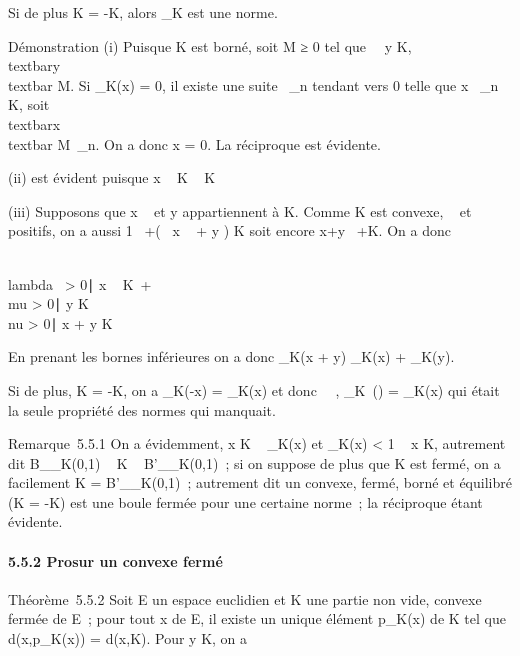 \documentclass[]{article}
\begin{document}
Si de plus K = -K, alors \jmath\_K est une norme.

Démonstration (i) Puisque K est borné, soit M ≥ 0 tel que
\forall~~y \in K,
\\textbar{}y\\textbar{} \leq M. Si
\jmath\_K(x) = 0, il existe une suite \lambda~\_n tendant vers 0
telle que  x \over \lambda~\_n \in K, soit
\\textbar{}x\\textbar{} \leq M\lambda~\_n.
On a donc x = 0. La réciproque est évidente.

(ii) est évident puisque  x \over \lambda~ \in K
\Leftrightarrow \mux \over \mu\lambda~ \in K

(iii) Supposons que  x \over \lambda~ et  y
\over \mu appartiennent à K. Comme K est convexe, \lambda~ et \mu
positifs, on a aussi  1 \over \lambda~+\mu (\lambda~ x
\over \lambda~ + \mu y \over \mu ) \in K soit
encore  x+y \over \lambda~+\mu \in K. On a donc

\\lambda~ \textgreater{} 0∣ x
\over \lambda~ \in K\ + \\mu
\textgreater{} 0∣ y \over
\mu \in K\ \subset~\\nu \textgreater{}
0∣ x + y \over \nu \in
K\

En prenant les bornes inférieures on a donc \jmath\_K(x + y) \leq
\jmath\_K(x) + \jmath\_K(y).

Si de plus, K = -K, on a \jmath\_K(-x) = \jmath\_K(x) et donc
\forall~\mu \in {}~, \jmath\_K~(\mux) =
\textbar{}\mu\textbar{}\jmath\_K(x) qui était la seule propriété des
normes qui manquait.

Remarque~5.5.1 On a évidemment, x \in K \rigtharrow~ \jmath\_K(x)  et
\jmath\_K(x) \textless{} 1 \rigtharrow~ x \in K, autrement dit
B\_\jmath\_K(0,1) \subset~ K \subset~ B'\_\jmath\_K(0,1)~; si on
suppose de plus que K est fermé, on a facilement K =
B'\_\jmath\_K(0,1)~; autrement dit un convexe, fermé, borné
et équilibré (K = -K) est une boule fermée pour une certaine norme~; la
réciproque étant évidente.

\paragraph{5.5.2 Pro\jmathection sur un convexe fermé}

Théorème~5.5.2 Soit E un espace euclidien et K une partie non vide,
convexe fermée de E~; pour tout x de E, il existe un unique élément
p\_K(x) de K tel que d(x,p\_K(x)) = d(x,K). Pour y \in K,
on a
\end{document}
